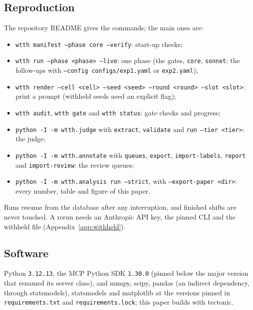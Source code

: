 \subsection{Reproduction}
The repository README gives the commands; the main ones are:
\begin{itemize}\raggedright
\item \texttt{wtth manifest --phase core --verify}: start-up checks;
\item \texttt{wtth run --phase <phase> --live}: one phase (the gates, \texttt{core}, \texttt{sonnet}; the follow-ups with \texttt{--config configs/exp1.yaml} or \texttt{exp2.yaml});
\item \texttt{wtth render --cell <cell> --seed <seed> --round <round> --slot <slot>}: print a prompt (withheld seeds need an explicit flag);
\item \texttt{wtth audit}, \texttt{wtth gate} and \texttt{wtth status}: gate checks and progress;
\item \texttt{python -I -m wtth.judge} with \texttt{extract}, \texttt{validate} and \texttt{run --tier <tier>}: the judge;
\item \texttt{python -I -m wtth.annotate} with \texttt{queues}, \texttt{export}, \texttt{import-labels}, \texttt{report} and \texttt{import-review}: the review queues;
\item \texttt{python -I -m wtth.analysis run --strict}, with \texttt{--export-paper <dir>}: every number, table and figure of this paper.
\end{itemize}
Runs resume from the database after any interruption, and finished shifts are never touched.
A rerun needs an Anthropic API key, the pinned CLI and the withheld file (Appendix~\ref{app:withheld}).

\subsection{Software}
Python \texttt{3.12.13}, the MCP Python SDK \texttt{1.30.0} (pinned below the major version that renamed its server class), and numpy, scipy, pandas (an indirect dependency, through statsmodels), statsmodels and matplotlib at the versions pinned in \texttt{requirements.txt} and \texttt{requirements.lock}; this paper builds with tectonic.

